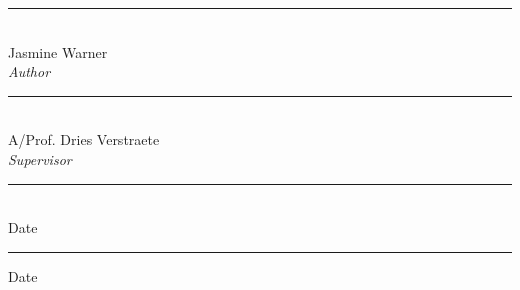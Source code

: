 \begin{declaration}
\vfill
\begin{center}
    \begin{minipage}[t]{0.4\textwidth}
        \begin{flushleft}
            \rule{\textwidth}{0.5pt}\\
            Jasmine Warner\\
            \emph{Author}
            \\[1.5cm]
            \rule{\textwidth}{0.5pt}\\
            A/Prof. Dries Verstraete\\
            \emph{Supervisor}
        \end{flushleft}
    \end{minipage}
    \hspace{1cm}
    \begin{minipage}[t]{0.4\textwidth}
        \begin{flushleft}
            \rule{\textwidth}{0.5pt}\\
            Date
            \\[2.15cm]
            \rule{\textwidth}{0.5pt}
            Date
        \end{flushleft}
    \end{minipage}
\end{center}


\end{declaration}
\restoregeometry

